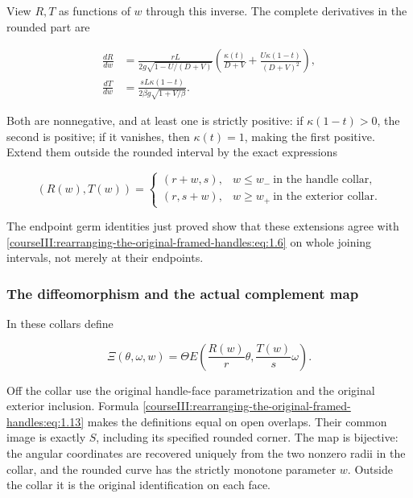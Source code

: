 View \(R,T\) as functions of \(w\) through this inverse. The complete derivatives in the rounded part are

\begin{equation}
\begin{aligned}
\frac{dR}{dw}
&=\frac{rL}{2g\sqrt{1-U/(D+V)}}
\left(\frac{\kappa(t)}{D+V}
+\frac{U\kappa(1-t)}{(D+V)^2}\right),\\
\frac{dT}{dw}
&=\frac{sL\kappa(1-t)}
 {2\beta g\sqrt{1+V/\beta}}.
\end{aligned}
\label{courseIII:rearranging-the-original-framed-handles:eq:1.12}
\end{equation}

Both are nonnegative, and at least one is strictly positive: if \(\kappa(1-t)>0\), the second is positive; if it vanishes, then \(\kappa(t)=1\), making the first positive. Extend them outside the rounded interval by the exact expressions

\begin{equation}
(R(w),T(w))=
\begin{cases}
(r+w,s),&w\leq w_-\ \text{in the handle collar},\\
(r,s+w),&w\geq w_+\ \text{in the exterior collar}.
\end{cases}
\label{courseIII:rearranging-the-original-framed-handles:eq:1.13}
\end{equation}

The endpoint germ identities just proved show that these extensions agree with \eqref{courseIII:rearranging-the-original-framed-handles:eq:1.6} on whole joining intervals, not merely at their endpoints.

\subsubsection{The diffeomorphism and the actual complement map}
\label{courseIII:rearranging-the-original-framed-handles:section-1.3}

In these collars define

\begin{equation}
\Xi(\theta,\omega,w)
=\Theta E\left(\frac{R(w)}r\theta,\frac{T(w)}s\omega\right).
\label{courseIII:rearranging-the-original-framed-handles:eq:1.14}
\end{equation}

Off the collar use the original handle-face parametrization and the original exterior inclusion. Formula \eqref{courseIII:rearranging-the-original-framed-handles:eq:1.13} makes the definitions equal on open overlaps. Their common image is exactly \(S\), including its specified rounded corner. The map is bijective: the angular coordinates are recovered uniquely from the two nonzero radii in the collar, and the rounded curve has the strictly monotone parameter \(w\). Outside the collar it is the original identification on each face.


